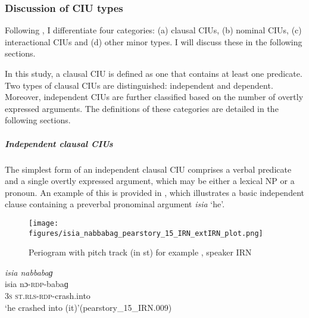 \subsubsection{Discussion of CIU types}\label{sec:discussion-of-iu-types}

Following \citet{Tao_1996}, I differentiate four  categories: (a) clausal CIUs, (b) nominal CIUs, (c) interactional CIUs and (d) other minor types. I will discuss these in the following sections.



\label{sec:clausal-ius}

In this study, a clausal CIU is defined as one that contains at least one predicate. Two types of clausal CIUs are distinguished: independent and dependent. Moreover, independent CIUs are further classified based on the number of overtly expressed arguments. The definitions of these categories are detailed in the following sections.

\subparagraph{Independent clausal CIUs}
\label{sec:independent-clausal-cius} 

The simplest form of an independent clausal CIU comprises a verbal predicate and a single overtly expressed argument, which may be either a lexical NP or a pronoun. An example of this is provided in , which illustrates a basic independent clause containing a preverbal pronominal argument \textit{isia} `he'.

\begin{figure}
	\texttt{[image: figures/isia\_nabbabag\_pearstory\_15\_IRN\_extIRN\_plot.png]}
	\caption{Periogram with pitch track (in st) for example , speaker IRN}
	\label{pitch:isia nabbabag}
\end{figure}

\ea
\label{ex:isia nabbabag}
\textit{isia nabbabaɡ} \\
\gll isia nɔ-\textsc{rdp}-babaɡ \\
\textsc{3s} \textsc{st.rls-rdp}-crash.into\\ 
\glt ‘he crashed into (it)’\hfill (pearstory\_15\_IRN.009)
\z



